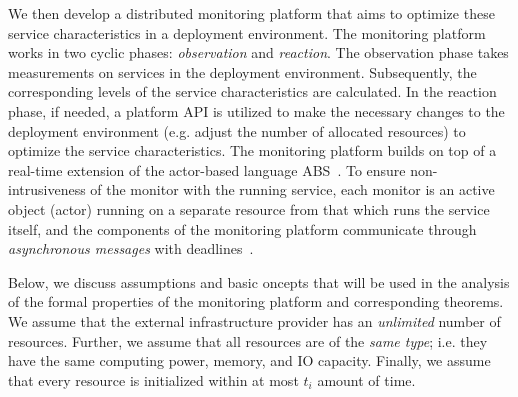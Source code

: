 We then develop a distributed monitoring platform that aims to optimize these service
characteristics in a deployment environment.
The monitoring platform works in two cyclic phases: \emph{observation} and \emph{reaction}.
The observation phase takes measurements on services in the deployment environment.
Subsequently, the corresponding levels of the service characteristics are calculated.
In the reaction phase, if needed, a platform API is utilized to make the necessary changes to the deployment environment (e.g. adjust the number of allocated resources) to optimize the service characteristics.
The monitoring platform builds on top of a real-time extension of the 
actor-based language ABS~\cite{johnsen2012abs}.
To ensure non-intrusiveness of the monitor with the running service,
each monitor is an active object (actor) running on a separate resource
from that which runs the service itself, and the components of the monitoring platform communicate through \emph{asynchronous messages} with deadlines~\cite{johnsen2012modeling}.

Below, we discuss assumptions and basic oncepts that will be used in the
analysis of the formal properties of the monitoring platform and corresponding theorems.
We assume that the external infrastructure provider has an  \emph{unlimited} number of resources.
Further, we assume that all resources are of the \emph{same type}; i.e. they have the same computing power, memory, and IO capacity.
Finally, we assume that every resource   is initialized within  at most $t_i$ amount of time.



